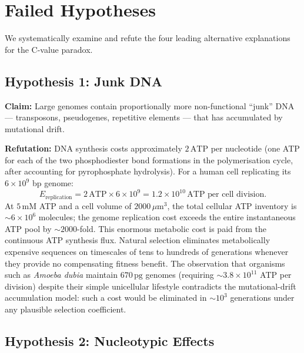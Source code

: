 \section{Failed Hypotheses}
\label{sec:failed_hypotheses}

We systematically examine and refute the four leading alternative
explanations for the C-value paradox.

\subsection{Hypothesis 1: Junk DNA}
\label{ssec:junk_hypothesis}

\textbf{Claim:} Large genomes contain proportionally more non-functional
``junk'' DNA --- transposons, pseudogenes, repetitive elements --- that
has accumulated by mutational drift.

\textbf{Refutation:} DNA synthesis costs approximately $2\,\mathrm{ATP}$
per nucleotide (one ATP for each of the two phosphodiester bond formations
in the polymerisation cycle, after accounting for pyrophosphate hydrolysis).
For a human cell replicating its $6\times 10^9$ bp genome:
\begin{equation}
  E_{\mathrm{replication}} = 2\,\mathrm{ATP} \times 6\times 10^9
    = 1.2\times 10^{10}\,\mathrm{ATP}\text{ per cell division}.
\end{equation}
At $5\,\mathrm{mM}$ ATP and a cell volume of $2000\,\mu\mathrm{m}^3$,
the total cellular ATP inventory is $\sim 6\times 10^6$ molecules; the
genome replication cost exceeds the entire instantaneous ATP pool by
$\sim 2000$-fold. This enormous metabolic cost is paid from the
continuous ATP synthesis flux. Natural selection eliminates metabolically
expensive sequences on timescales of tens to hundreds of generations
whenever they provide no compensating fitness benefit. The observation
that organisms such as \textit{Amoeba dubia} maintain $670\,\mathrm{pg}$
genomes (requiring $\sim 3.8\times 10^{11}$ ATP per division) despite
their simple unicellular lifestyle contradicts the mutational-drift
accumulation model: such a cost would be eliminated in $\sim 10^3$
generations under any plausible selection coefficient.

\subsection{Hypothesis 2: Nucleotypic Effects}
\label{ssec:nucleotypic}

